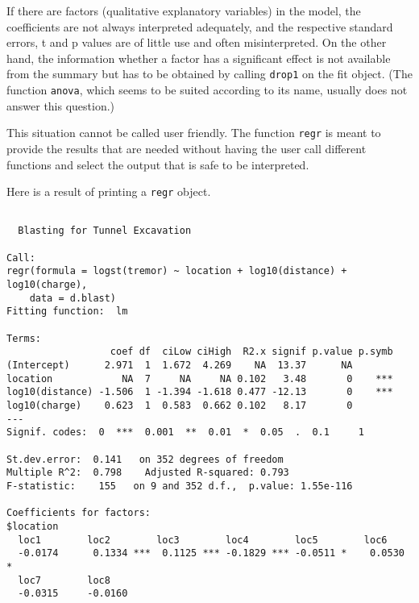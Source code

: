 \documentclass{article}
\providecommand{\T}{\texttt}
\begin{document}
If there are factors (qualitative explanatory variables) in the model, 
the coefficients are not always interpreted adequately, and the 
respective standard errors, t and p values are of little use and often
misinterpreted. 
On the other hand, the information whether a factor has a significant
effect is not available from the summary but has to be obtained by calling 
\T{drop1} on the fit object. 
(The function \T{anova}, which seems to be suited according to its
name, usually does not answer this question.)

This situation cannot be called user friendly.
The function \T{regr} is meant to provide the results that are needed
without having the user call different functions and select the 
output that is safe to be interpreted.

Here is a result of printing a \T{regr} object.
\begin{verbatim}

  Blasting for Tunnel Excavation 

Call:
regr(formula = logst(tremor) ~ location + log10(distance) + log10(charge), 
    data = d.blast)
Fitting function:  lm 

Terms:
                  coef df  ciLow ciHigh  R2.x signif p.value p.symb
(Intercept)      2.971  1  1.672  4.269    NA  13.37      NA       
location            NA  7     NA     NA 0.102   3.48       0    ***
log10(distance) -1.506  1 -1.394 -1.618 0.477 -12.13       0    ***
log10(charge)    0.623  1  0.583  0.662 0.102   8.17       0       
---
Signif. codes:  0  ***  0.001  **  0.01  *  0.05  .  0.1     1  

St.dev.error:  0.141   on 352 degrees of freedom
Multiple R^2:  0.798    Adjusted R-squared: 0.793 
F-statistic:    155   on 9 and 352 d.f.,  p.value: 1.55e-116 

Coefficients for factors:
$location
  loc1        loc2        loc3        loc4        loc5        loc6       
  -0.0174      0.1334 ***  0.1125 *** -0.1829 *** -0.0511 *    0.0530 *  
  loc7        loc8       
  -0.0315     -0.0160    
\end{verbatim}
\end{document}
